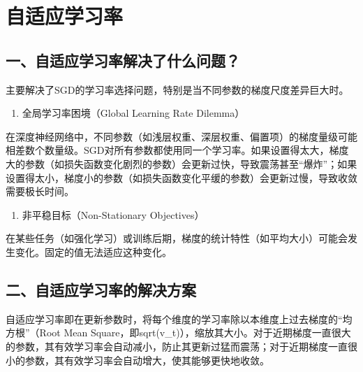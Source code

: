 \setcounter{section}{2}

\hypertarget{ux81eaux9002ux5e94ux5b66ux4e60ux7387}{%
\section{自适应学习率}\label{ux81eaux9002ux5e94ux5b66ux4e60ux7387}}

\hypertarget{ux4e00ux81eaux9002ux5e94ux5b66ux4e60ux7387ux89e3ux51b3ux4e86ux4ec0ux4e48ux95eeux9898}{%
\subsection{一、自适应学习率解决了什么问题？}\label{ux4e00ux81eaux9002ux5e94ux5b66ux4e60ux7387ux89e3ux51b3ux4e86ux4ec0ux4e48ux95eeux9898}}

主要解决了SGD的学习率选择问题，特别是当不同参数的梯度尺度差异巨大时。

\begin{enumerate}
\def\labelenumi{\arabic{enumi}.}
\tightlist
\item
  全局学习率困境（Global Learning Rate Dilemma）
\end{enumerate}

在深度神经网络中，不同参数（如浅层权重、深层权重、偏置项）的梯度量级可能相差数个数量级。SGD对所有参数都使用同一个学习率。如果设置得太大，梯度大的参数（如损失函数变化剧烈的参数）会更新过快，导致震荡甚至``爆炸''；如果设置得太小，梯度小的参数（如损失函数变化平缓的参数）会更新过慢，导致收敛需要极长时间。

\begin{enumerate}
\def\labelenumi{\arabic{enumi}.}
\setcounter{enumi}{1}
\tightlist
\item
  非平稳目标（Non-Stationary Objectives）
\end{enumerate}

在某些任务（如强化学习）或训练后期，梯度的统计特性（如平均大小）可能会发生变化。固定的值无法适应这种变化。

\hypertarget{ux4e8cux81eaux9002ux5e94ux5b66ux4e60ux7387ux7684ux89e3ux51b3ux65b9ux6848}{%
\subsection{二、自适应学习率的解决方案}\label{ux4e8cux81eaux9002ux5e94ux5b66ux4e60ux7387ux7684ux89e3ux51b3ux65b9ux6848}}

自适应学习率即在更新参数时，将每个维度的学习率除以本维度上过去梯度的``均方根''（Root Mean Square，即sqrt(v\_t)），缩放其大小。对于近期梯度一直很大的参数，其有效学习率会自动减小，防止其更新过猛而震荡；对于近期梯度一直很小的参数，其有效学习率会自动增大，使其能够更快地收敛。

